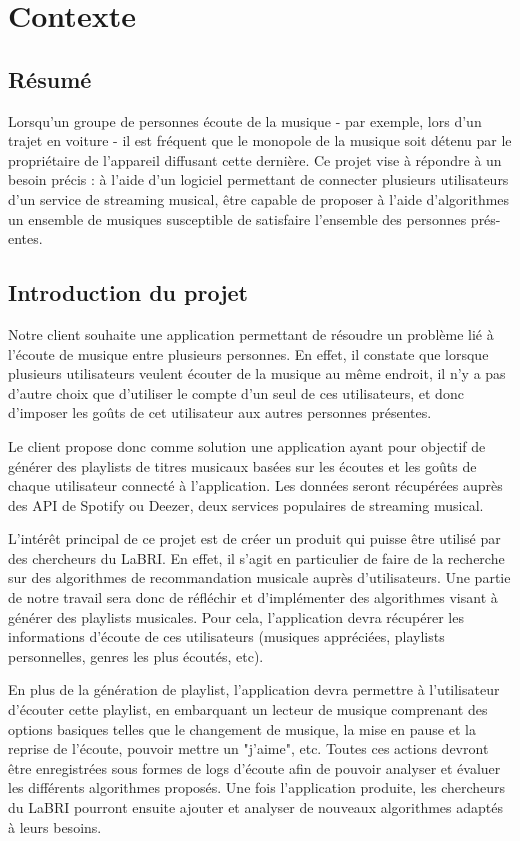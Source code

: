 \documentclass{article}
\begin{document}
		\section{Contexte}
    	\subsection{Résumé}
    	Lorsqu'un groupe de personnes écoute de la musique - par exemple, lors d'un trajet en voiture - il est fréquent que le monopole de la musique soit détenu par le propriétaire de l'appareil diffusant cette dernière. Ce projet vise à répondre à un besoin précis : à l'aide d'un logiciel permettant de connecter plusieurs utilisateurs d'un service de streaming musical, être capable de proposer à l'aide d'algorithmes un ensemble de musiques susceptible de satisfaire l'ensemble des personnes prés- entes.
    	
    	\subsection{Introduction du projet}
		Notre client souhaite une application permettant de résoudre un problème lié à l'écoute de musique entre plusieurs personnes. En effet, il constate que lorsque plusieurs utilisateurs veulent écouter de la musique au même endroit, il n'y a pas d'autre choix que d'utiliser le compte d'un seul de ces utilisateurs, et donc d'imposer les goûts de cet utilisateur aux autres personnes présentes.
		
		Le client propose donc comme solution une application ayant pour objectif de générer des playlists de titres musicaux basées sur les écoutes et les goûts de chaque utilisateur connecté à l'application. Les données seront récupérées auprès des API de Spotify ou Deezer, deux services populaires de streaming musical.
		
    	L'intérêt principal de ce projet est de créer un produit qui puisse être utilisé par des chercheurs du LaBRI. En effet, il s'agit en particulier de faire de la recherche sur des algorithmes de recommandation musicale auprès d'utilisateurs. Une partie de notre travail sera donc de réfléchir et d'implémenter des algorithmes visant à générer des playlists musicales. Pour cela, l'application devra récupérer les informations d'écoute de ces utilisateurs (musiques appréciées, playlists personnelles, genres les plus écoutés, etc). 
    	
    	En plus de la génération de playlist, l'application devra permettre à l'utilisateur d'écouter cette playlist, en embarquant un lecteur de musique comprenant des options basiques telles que le changement de musique, la mise en pause et la reprise de l'écoute, pouvoir mettre un "j'aime", etc. Toutes ces actions devront être enregistrées sous formes de logs d'écoute afin de pouvoir analyser et évaluer les différents algorithmes proposés. Une fois l'application produite, les chercheurs du LaBRI pourront ensuite ajouter et analyser de nouveaux algorithmes adaptés à leurs besoins.
								
\end{document}
